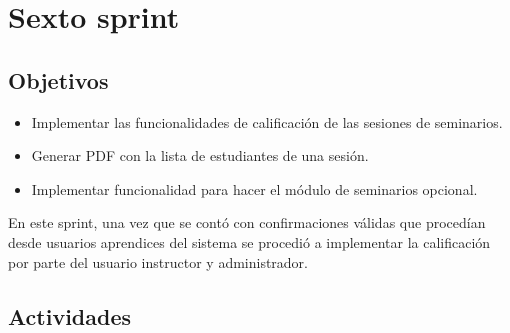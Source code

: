 \section{Sexto sprint} %
\label{sec:sexto_sprint}

\subsection{Objetivos}

\begin{itemize}
	\item Implementar las funcionalidades de calificación de las sesiones de seminarios.
	\item Generar \gls{PDF} con la lista de estudiantes de una sesión.
	\item Implementar funcionalidad para hacer el módulo de seminarios opcional.
\end{itemize}

En este sprint, una vez que se contó con confirmaciones válidas que procedían desde usuarios aprendices del sistema se procedió a implementar la calificación por parte del usuario instructor y administrador. 

\subsection{Actividades} %
\label{sub:actividades6}

